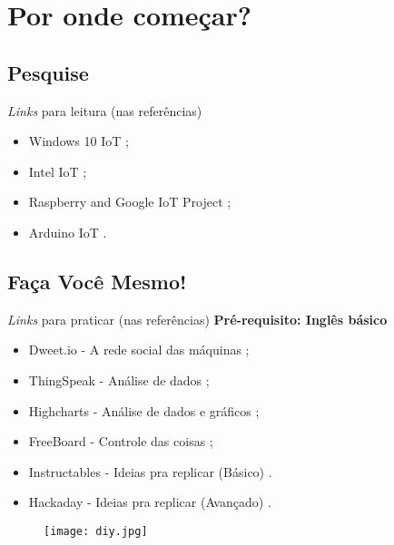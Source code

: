 \section{Por onde começar?}
\label{sec:comeco}

\subsection*{Pesquise}
\begin{frame}{}
	\begin{block}{\textit{Links} para leitura (nas referências)}
		\begin{itemize}
			\item Windows 10 IoT \cite{WindowsIot};
			\item Intel IoT \cite{IntelIot};
			\item Raspberry and Google IoT Project \cite{RaspberryGoogleIot};
			\item Arduino IoT \cite{ArduinoIot}.		
		\end{itemize}
	\end{block}
\end{frame}

\subsection*{Faça Você Mesmo!}
\begin{frame}{}
	\begin{block}{\textit{Links} para praticar (nas referências)}
		\textbf{Pré-requisito: Inglês básico}
		\begin{itemize}
			\item Dweet.io - A rede social das máquinas \cite{DweetIot};
			\item ThingSpeak - Análise de dados \cite{ThingSpeakIot};
			\item Highcharts - Análise de dados e gráficos \cite{HighChartsIot};
			\item FreeBoard - Controle das coisas \cite{FreeBoardIot};
			\item Instructables - Ideias pra replicar (Básico) \cite{InstructablesIot}. 
			\item Hackaday - Ideias pra replicar (Avançado) \cite{HackadayIot}.
		\end{itemize}
	\end{block}
	\begin{figure}[H]
		\texttt{[image: diy.jpg]}\footnotemark
	\end{figure}
	
\end{frame}